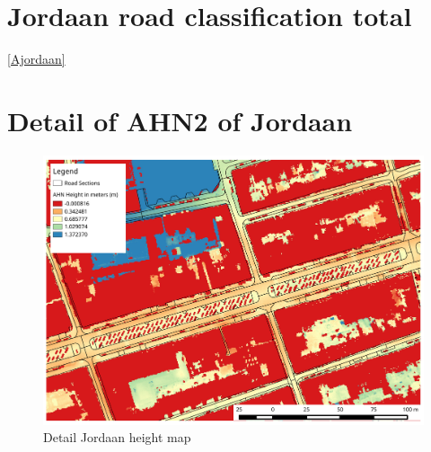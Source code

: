 \begin{appendix}
\clearpage

\section{Jordaan road classification total}\ref{Ajordaan}


\clearpage

\section{Detail of AHN2 of Jordaan}\label{AAHN}
\begin{figure}[h]
\includegraphics[width=\textwidth]{img/R_AHN_jordaan.pdf}
\centering
\caption{
Detail Jordaan height map\label{jordaanahn}}
\end{figure} 

\clearpage


\end{appendix}
